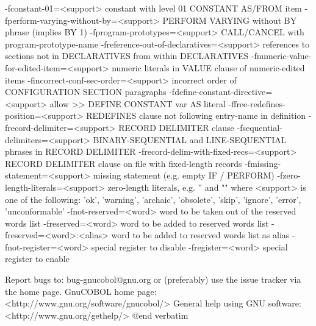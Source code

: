   -fconstant-01=<support>	constant with level 01 CONSTANT AS/FROM item
  -fperform-varying-without-by=<support>	PERFORM VARYING without BY phrase (implies BY 1)
  -fprogram-prototypes=<support>	CALL/CANCEL with program-prototype-name
  -freference-out-of-declaratives=<support>	references to sections not in DECLARATIVES from within DECLARATIVES
  -fnumeric-value-for-edited-item=<support>	numeric literals in VALUE clause of numeric-edited items
  -fincorrect-conf-sec-order=<support>	incorrect order of CONFIGURATION SECTION paragraphs
  -fdefine-constant-directive=<support>	allow >> DEFINE CONSTANT var AS literal
  -ffree-redefines-position=<support>	REDEFINES clause not following entry-name in definition
  -frecord-delimiter=<support>	RECORD DELIMITER clause
  -fsequential-delimiters=<support>	BINARY-SEQUENTIAL and LINE-SEQUENTIAL phrases in RECORD DELIMITER
  -frecord-delim-with-fixed-recs=<support>	RECORD DELIMITER clause on file with fixed-length records
  -fmissing-statement=<support>	missing statement (e.g. empty IF / PERFORM)
  -fzero-length-literals=<support>	zero-length literals, e.g. '' and ""
	where <support> is one of the following:
	'ok', 'warning', 'archaic', 'obsolete', 'skip', 'ignore', 'error', 'unconformable'
  -fnot-reserved=<word>  word to be taken out of the reserved words list
  -freserved=<word>      word to be added to reserved words list
  -freserved=<word>:<alias>	word to be added to reserved words list as alias
  -fnot-register=<word>  special register to disable
  -fregister=<word>      special register to enable


Report bugs to: bug-gnucobol@gnu.org
or (preferably) use the issue tracker via the home page.
GnuCOBOL home page: <http://www.gnu.org/software/gnucobol/>
General help using GNU software: <http://www.gnu.org/gethelp/>
@end verbatim
